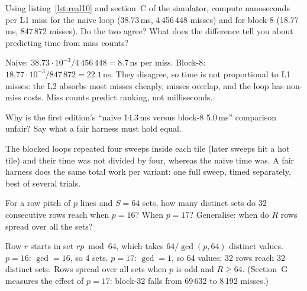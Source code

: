 \begin{exercise}[hard]
Using listing~\ref{lst:real10} and section~C of the simulator, compute
nanoseconds per L1 miss for the naive loop (38.73\,ms, 4\,456\,448 misses)
and for block-8 (18.77\,ms, 847\,872 misses). Do the two agree? What does
the difference tell you about predicting time from miss counts?
\end{exercise}
\begin{solution}[hint]
Naive: $38.73\cdot10^{-3}/4\,456\,448=8.7$\,ns per miss. Block-8:
$18.77\cdot10^{-3}/847\,872=22.1$\,ns. They disagree, so time is not
proportional to L1 misses: the L2 absorbs most misses cheaply, misses
overlap, and the loop has non-miss costs. Miss counts predict ranking,
not milliseconds.
\end{solution}

\begin{exercise}[medium]
Why is the first edition's ``naive 14.3\,ms versus block-8 5.0\,ms''
comparison unfair? Say what a fair harness must hold equal.
\end{exercise}
\begin{solution}[hint]
The blocked loops repeated four sweeps inside each tile (later sweeps
hit a hot tile) and their time was not divided by four, whereas the
naive time was. A fair harness does the same total work per variant:
one full sweep, timed separately, best of several trials.
\end{solution}

\begin{exercise}[hard]
For a row pitch of $p$ lines and $S{=}64$ sets, how many distinct sets do
32 consecutive rows reach when $p=16$? When $p=17$? Generalise: when
do $R$ rows spread over all the sets?
\end{exercise}
\begin{solution}[hint]
Row $r$ starts in set $rp \bmod 64$, which takes $64/\gcd(p,64)$ distinct
values. $p=16$: $\gcd=16$, so 4 sets. $p=17$: $\gcd=1$, so 64 values;
32 rows reach 32 distinct sets. Rows spread over all sets when $p$ is odd
and $R\ge64$. (Section~G measures the effect of $p=17$: block-32 falls
from 69\,632 to 8\,192 misses.)
\end{solution}
